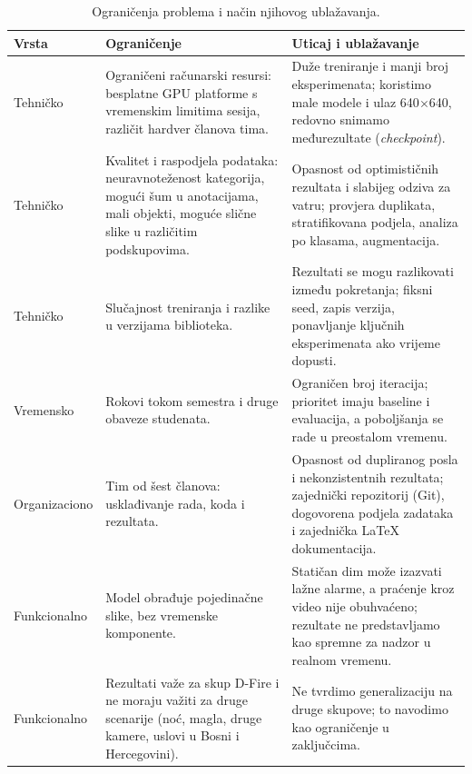 \begin{table}[H]
\centering
\small
\begin{tabularx}{\linewidth}{@{}>{\raggedright\arraybackslash}p{2.1cm}>{\raggedright\arraybackslash}p{4.6cm}>{\raggedright\arraybackslash}X@{}}
\toprule
\textbf{Vrsta} & \textbf{Ograničenje} & \textbf{Uticaj i ublažavanje}\\
\midrule
Tehničko & Ograničeni računarski resursi: besplatne GPU platforme s vremenskim limitima sesija, različit hardver članova tima. & Duže treniranje i manji broj eksperimenata; koristimo male modele i ulaz 640$\times$640, redovno snimamo međurezultate (\emph{checkpoint}).\\
Tehničko & Kvalitet i raspodjela podataka: neuravnoteženost kategorija, mogući šum u anotacijama, mali objekti, moguće slične slike u različitim podskupovima. & Opasnost od optimističnih rezultata i slabijeg odziva za vatru; provjera duplikata, stratifikovana podjela, analiza po klasama, augmentacija.\\
Tehničko & Slučajnost treniranja i razlike u verzijama biblioteka. & Rezultati se mogu razlikovati između pokretanja; fiksni seed, zapis verzija, ponavljanje ključnih eksperimenata ako vrijeme dopusti.\\
Vremensko & Rokovi tokom semestra i druge obaveze studenata. & Ograničen broj iteracija; prioritet imaju baseline i evaluacija, a poboljšanja se rade u preostalom vremenu.\\
Organizaciono & Tim od šest članova: usklađivanje rada, koda i rezultata. & Opasnost od dupliranog posla i nekonzistentnih rezultata; zajednički repozitorij (Git), dogovorena podjela zadataka i zajednička LaTeX dokumentacija.\\
Funkcionalno & Model obrađuje pojedinačne slike, bez vremenske komponente. & Statičan dim može izazvati lažne alarme, a praćenje kroz video nije obuhvaćeno; rezultate ne predstavljamo kao spremne za nadzor u realnom vremenu.\\
Funkcionalno & Rezultati važe za skup D-Fire i ne moraju važiti za druge scenarije (noć, magla, druge kamere, uslovi u Bosni i Hercegovini). & Ne tvrdimo generalizaciju na druge skupove; to navodimo kao ograničenje u zaključcima.\\
\bottomrule
\end{tabularx}
\caption{Ograničenja problema i način njihovog ublažavanja.}
\label{tab:ogranicenja}
\end{table}
